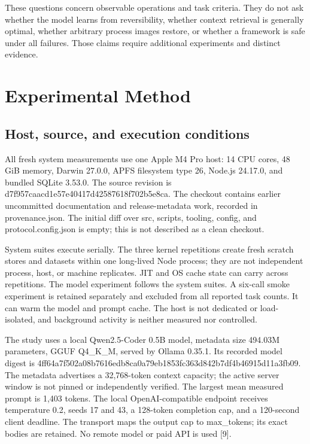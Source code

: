 \documentclass[11pt,a4paper]{article}
\begin{document}
These questions concern observable operations and task criteria. They do not ask whether the model learns from reversibility, whether context retrieval is generally optimal, whether arbitrary process images restore, or whether a framework is safe under all failures. Those claims require additional experiments and distinct evidence.


\section{Experimental Method}

\subsection{Host, source, and execution conditions}

All fresh system measurements use one Apple M4 Pro host: 14 CPU cores, 48 GiB memory, Darwin 27.0.0, APFS filesystem type 26, Node.js 24.17.0, and bundled SQLite 3.53.0. The source revision is d7f957caacd1e57e40417d42587618f702b5e8ca. The checkout contains earlier uncommitted documentation and release-metadata work, recorded in provenance.json. The initial diff over src, scripts, tooling, config, and protocol.config.json is empty; this is not described as a clean checkout.


System suites execute serially. The three kernel repetitions create fresh scratch stores and datasets within one long-lived Node process; they are not independent process, host, or machine replicates. JIT and OS cache state can carry across repetitions. The model experiment follows the system suites. A six-call smoke experiment is retained separately and excluded from all reported task counts. It can warm the model and prompt cache. The host is not dedicated or load-isolated, and background activity is neither measured nor controlled.


The study uses a local Qwen2.5-Coder 0.5B model, metadata size 494.03M parameters, GGUF Q4\_K\_M, served by Ollama 0.35.1. Its recorded model digest is 4ff64a7f502a08b7616edb8ca0a79eb1853fc363d842b7df4b46915d11a3fb09. The metadata advertises a 32,768-token context capacity; the active server window is not pinned or independently verified. The largest mean measured prompt is 1,403 tokens. The local OpenAI-compatible endpoint receives temperature 0.2, seeds 17 and 43, a 128-token completion cap, and a 120-second client deadline. The transport maps the output cap to max\_tokens; its exact bodies are retained. No remote model or paid API is used [9].
\end{document}

